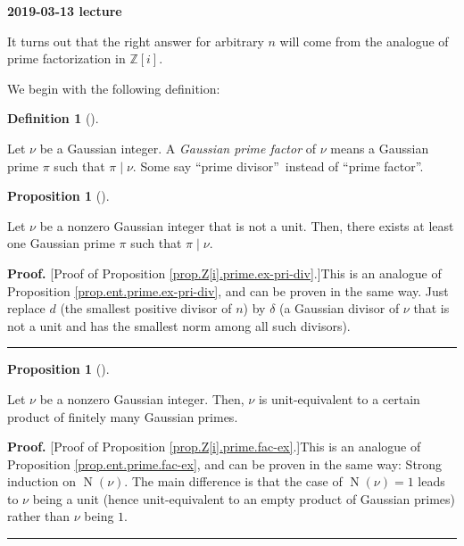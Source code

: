 \documentclass[numbers=enddot,12pt,final,onecolumn,notitlepage]{scrartcl}%
\numberwithin{exer}{subsection}
\theoremstyle{definition}
\newtheorem{prop}[theo]{Proposition}
\newenvironment{proposition}[1][]
{\begin{prop}[#1]\begin{leftbar}}
{\end{leftbar}\end{prop}}
\newtheorem{defi}[theo]{Definition}
\newenvironment{definition}[1][]
{\begin{defi}[#1]\begin{leftbar}}
{\end{leftbar}\end{defi}}
\newenvironment{proof}[1][Proof]{\noindent\textbf{#1.} }{\ \rule{0.5em}{0.5em}}
\newenvironment{noncompile}{}{}
\begin{document}
\begin{center}
\textbf{2019-03-13 lecture}
\end{center}

It turns out that the right answer for arbitrary $n$ will come from the
analogue of prime factorization in $\mathbb{Z}\left[  i\right]  $.

\begin{noncompile}
We begin with the following definition:

\begin{definition}
Let $\nu$ be a Gaussian integer. A \textit{Gaussian prime factor} of $\nu$
means a Gaussian prime $\pi$ such that $\pi\mid\nu$. Some say
\textquotedblleft prime divisor\textquotedblright\ instead of
\textquotedblleft prime factor\textquotedblright.
\end{definition}
\end{noncompile}

\begin{proposition}
\label{prop.Z[i].prime.ex-pri-div}Let $\nu$ be a nonzero Gaussian integer that
is not a unit. Then, there exists at least one Gaussian prime $\pi$ such that
$\pi\mid\nu$.
\end{proposition}

\begin{proof}
[Proof of Proposition \ref{prop.Z[i].prime.ex-pri-div}.]This is an analogue of
Proposition \ref{prop.ent.prime.ex-pri-div}, and can be proven in the same
way. Just replace $d$ (the smallest positive divisor of $n$) by $\delta$ (a
Gaussian divisor of $\nu$ that is not a unit and has the smallest norm among
all such divisors).
\end{proof}

\begin{proposition}
\label{prop.Z[i].prime.fac-ex}Let $\nu$ be a nonzero Gaussian integer. Then,
$\nu$ is unit-equivalent to a certain product of finitely many Gaussian primes.
\end{proposition}

\begin{proof}
[Proof of Proposition \ref{prop.Z[i].prime.fac-ex}.]This is an analogue of
Proposition \ref{prop.ent.prime.fac-ex}, and can be proven in the same way:
Strong induction on $\operatorname*{N}\left(  \nu\right)  $. The main
difference is that the case of $\operatorname*{N}\left(  \nu\right)  =1$ leads
to $\nu$ being a unit (hence unit-equivalent to an empty product of Gaussian
primes) rather than $\nu$ being $1$.
\end{proof}
\end{document}
